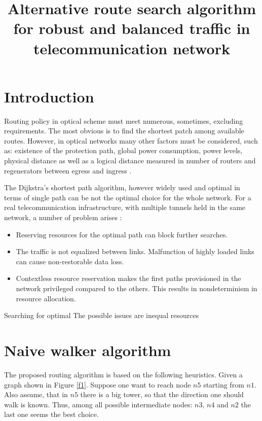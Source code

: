 \documentclass{IEEEtran}
\title{Alternative route search algorithm for robust and balanced traffic in telecommunication network}
\begin{document}
\maketitle

\section{Introduction}

Routing policy in optical scheme must meet numerous, sometimes,
excluding requirements. The most obvious is to find the shortest
patch among available routes. However, in optical networks
many other factors must be considered, such as: existence of the protection
path, global power consumption, power levels, physical 
distance as well as a logical distance measured in 
number of routers and regenerators between egress and ingress \cite{load1,load2}.

The Dijkstra's shortest path algorithm, however widely used and 
optimal in terms of single path can be not the optimal choice 
for the whole network.  For a real telecommunication infrastructure, with multiple
tunnels held in the same network, a number of problem arises \cite{path1}:
\begin{itemize}
\item Reserving resources for the optimal path can block further 
searches.
\item The traffic is not equalized between links. Malfunction of 
highly loaded links can cause non-restorable data loss.
\item Contextless resource reservation makes the first 
paths provisioned in the network privileged compared to the others.
This results in nondeterminism in resource allocation.


\end{itemize}


Searching for optimal 
The possible issues are inequal resources 






\section{Naive walker algorithm}

The proposed routing algorithm is based on the following 
heuristics. Given a graph shown in Figure \ref{f1}.
Suppose one want to reach node $n5$ starting from
$n1$. Also assume, that in $n5$ there is a big tower, so 
that the direction one should walk is known.
Thus, among all possible intermediate nodes:
$n3$, $n4$ and $n2$ the last one seems the best choice.
\end{document}

